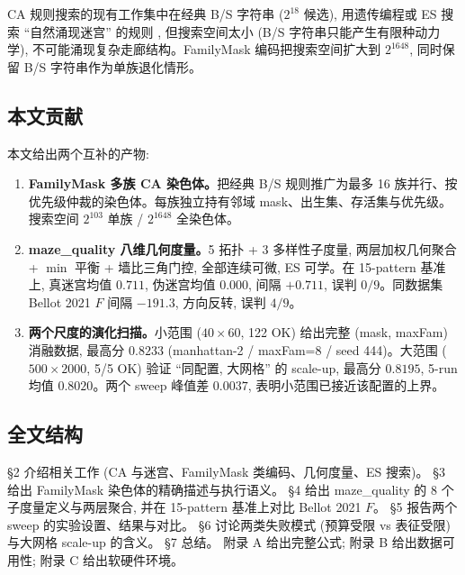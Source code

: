 CA 规则搜索的现有工作集中在经典 B/S 字符串 ($2^{18}$ 候选), 用遗传编程或 ES 搜索 ``自然涌现迷宫'' 的规则 \cite{rejbrand2017, mcclendon2001}, 但搜索空间太小 (B/S 字符串只能产生有限种动力学), 不可能涌现复杂走廊结构。FamilyMask 编码把搜索空间扩大到 $2^{1648}$, 同时保留 B/S 字符串作为单族退化情形。

\subsection{本文贡献}

本文给出两个互补的产物:
\begin{enumerate}[leftmargin=*, itemsep=0pt, topsep=0pt]
  \item \textbf{FamilyMask 多族 CA 染色体。}把经典 B/S 规则推广为最多 16 族并行、按优先级仲裁的染色体。每族独立持有邻域 mask、出生集、存活集与优先级。搜索空间 $2^{103}$ 单族 / $2^{1648}$ 全染色体。
  \item \textbf{maze\_quality 八维几何度量。}5 拓扑 + 3 多样性子度量, 两层加权几何聚合 + $\min$ 平衡 + 墙比三角门控, 全部连续可微, ES 可学。在 15-pattern 基准上, 真迷宫均值 $0.711$, 伪迷宫均值 $0.000$, 间隔 $+0.711$, 误判 $0/9$。同数据集 Bellot 2021 $F$ 间隔 $-191.3$, 方向反转, 误判 $4/9$。
  \item \textbf{两个尺度的演化扫描。}小范围 ($40 \times 60$, 122 OK) 给出完整 (mask, maxFam) 消融数据, 最高分 $0.8233$ (manhattan-2 / maxFam=8 / seed 444)。大范围 ($500 \times 2000$, 5/5 OK) 验证 ``同配置, 大网格'' 的 scale-up, 最高分 $0.8195$, 5-run 均值 $0.8020$。两个 sweep 峰值差 $0.0037$, 表明小范围已接近该配置的上界。
\end{enumerate}

\subsection{全文结构}

§2 介绍相关工作 (CA 与迷宫、FamilyMask 类编码、几何度量、ES 搜索)。
§3 给出 FamilyMask 染色体的精确描述与执行语义。
§4 给出 maze\_quality 的 8 个子度量定义与两层聚合, 并在 15-pattern 基准上对比 Bellot 2021 $F$。
§5 报告两个 sweep 的实验设置、结果与对比。
§6 讨论两类失败模式 (预算受限 vs 表征受限) 与大网格 scale-up 的含义。
§7 总结。
附录 A 给出完整公式; 附录 B 给出数据可用性; 附录 C 给出软硬件环境。
